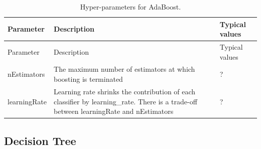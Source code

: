 \documentclass[11pt]{book}
\theoremstyle{definition}
\theoremstyle{definition}
\theoremstyle{definition}
\theoremstyle{remark}
\begin{document}
\begin{longtable}[]{@{}lll@{}}
\caption{\label{tab:adaBoostParameters} Hyper-parameters for AdaBoost.}\tabularnewline
\toprule
\begin{minipage}[b]{0.23\columnwidth}\raggedright
Parameter\strut
\end{minipage} & \begin{minipage}[b]{0.30\columnwidth}\raggedright
Description\strut
\end{minipage} & \begin{minipage}[b]{0.38\columnwidth}\raggedright
Typical values\strut
\end{minipage}\tabularnewline
\midrule
\endfirsthead
\toprule
\begin{minipage}[b]{0.23\columnwidth}\raggedright
Parameter\strut
\end{minipage} & \begin{minipage}[b]{0.30\columnwidth}\raggedright
Description\strut
\end{minipage} & \begin{minipage}[b]{0.38\columnwidth}\raggedright
Typical values\strut
\end{minipage}\tabularnewline
\midrule
\endhead
\begin{minipage}[t]{0.23\columnwidth}\raggedright
nEstimators\strut
\end{minipage} & \begin{minipage}[t]{0.30\columnwidth}\raggedright
The maximum number of estimators at which boosting is terminated\strut
\end{minipage} & \begin{minipage}[t]{0.38\columnwidth}\raggedright
?\strut
\end{minipage}\tabularnewline
\begin{minipage}[t]{0.23\columnwidth}\raggedright
learningRate\strut
\end{minipage} & \begin{minipage}[t]{0.30\columnwidth}\raggedright
Learning rate shrinks the contribution of each classifier by learning\_rate. There is a trade-off between learningRate and nEstimators\strut
\end{minipage} & \begin{minipage}[t]{0.38\columnwidth}\raggedright
?\strut
\end{minipage}\tabularnewline
\bottomrule
\end{longtable}

\hypertarget{decision-tree}{%
\subsection{Decision Tree}\label{decision-tree}}
\end{document}
